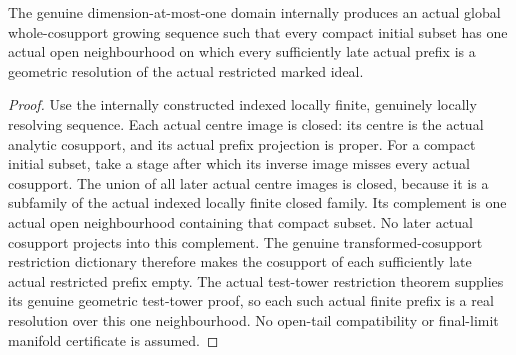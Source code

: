 \begin{theorem}
\label{hir:curve-global-open-resolving-tail}
\leanok
The genuine dimension-at-most-one domain internally produces an actual global
whole-cosupport growing sequence such that every compact initial subset has
one actual open neighbourhood on which every sufficiently late actual prefix
is a geometric resolution of the actual restricted marked ideal.
\end{theorem}
\begin{proof}
Use the internally constructed indexed locally finite, genuinely locally
resolving sequence. Each actual centre image is closed: its centre is the
actual analytic cosupport, and its actual prefix projection is proper.
For a compact initial subset, take a stage after which its inverse image
misses every actual cosupport. The union of all later actual centre images
is closed, because it is a subfamily of the actual indexed locally finite
closed family. Its complement is one actual open neighbourhood containing
that compact subset. No later actual cosupport projects into this complement.
The genuine transformed-cosupport restriction dictionary therefore makes
the cosupport of each sufficiently late actual restricted prefix empty.
The actual test-tower restriction theorem supplies its genuine geometric
test-tower proof, so each such actual finite prefix is a real resolution
over this one neighbourhood. No open-tail compatibility or final-limit
manifold certificate is assumed.
\end{proof}
